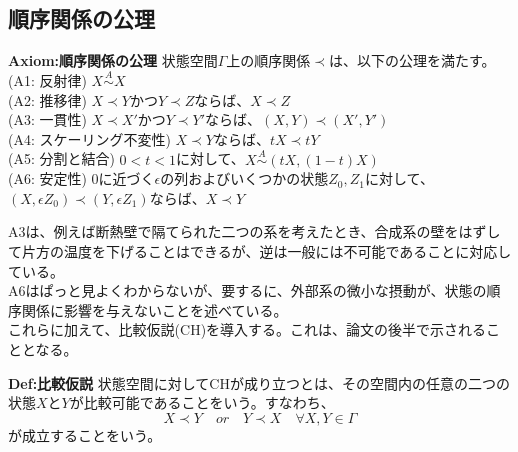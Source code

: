 \documentclass[a4paper,11pt]{jsarticle}
\numberwithin{equation}{section}
\begin{document}
\subsection{順序関係の公理}
\begin{itembox}[l]{\textbf{Axiom:順序関係の公理}}
    状態空間$\Gamma$上の順序関係$\prec$は、以下の公理を満たす。\\
    (A1: 反射律) $ X \overset{A}{\sim} X$\\
    (A2: 推移律) $X \prec Y$かつ$Y \prec Z$ならば、$X \prec Z$\\
    (A3: 一貫性) $X \prec X'$かつ$Y \prec Y'$ならば、$(X,Y) \prec (X',Y')$\\
    (A4: スケーリング不変性) $X \prec Y$ならば、$tX \prec tY$\\
    (A5: 分割と結合) $0<t<1$に対して、$X \overset{A}{\sim} (tX,(1-t)X)$\\
    (A6: 安定性) 0に近づく$\epsilon$の列およびいくつかの状態$Z_0,Z_1$に対して、$(X,\epsilon Z_0) \prec (Y,\epsilon Z_1)$ならば、$X \prec Y$ 
\end{itembox}
A3は、例えば断熱壁で隔てられた二つの系を考えたとき、合成系の壁をはずして片方の温度を下げることはできるが、逆は一般には不可能であることに対応している。\\
A6はぱっと見よくわからないが、要するに、外部系の微小な摂動が、状態の順序関係に影響を与えないことを述べている。\\
これらに加えて、比較仮説(CH)を導入する。これは、論文の後半で示されることとなる。\\
\begin{itembox}[l]{\textbf{Def:比較仮説}}
    状態空間に対してCHが成り立つとは、その空間内の任意の二つの状態$X$と$Y$が比較可能であることをいう。すなわち、
    \begin{equation}
        X \prec Y \quad or \quad Y \prec X \quad \forall X,Y \in \Gamma
    \end{equation}
    が成立することをいう。

\end{itembox}
\end{document}
